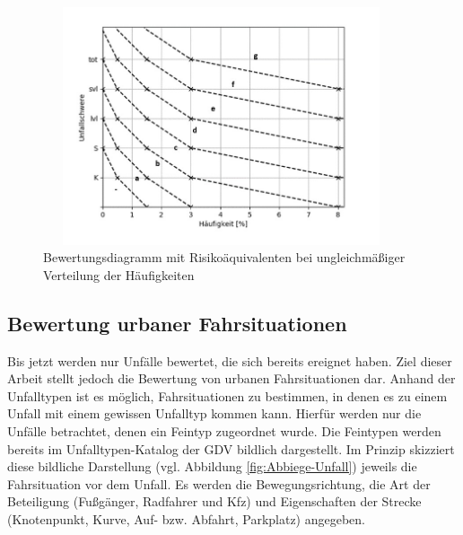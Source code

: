 \begin{savenotes}
	\begin{figure}[H]
		\centering
		\includegraphics[width=10.5cm,height=7cm]{figures/Bewertungsdiagramm(2)}
		\caption[Bewertungsdiagramm mit Risikoäquivalenten bei ungleichmäßiger Verteilung der Häufigkeiten]{Bewertungsdiagramm mit Risikoäquivalenten bei ungleichmäßiger Verteilung der Häufigkeiten}\label{fig:Bewertungsdiagramm(2)}
	\end{figure}
\end{savenotes}

\subsection{Bewertung urbaner Fahrsituationen}\label{subsection:Bewertungs urbaner Fahrsituationen}
Bis jetzt werden nur Unfälle bewertet, die sich bereits ereignet haben. Ziel dieser Arbeit stellt jedoch die Bewertung von urbanen Fahrsituationen dar. Anhand der Unfalltypen ist es möglich, Fahrsituationen zu bestimmen, in denen es zu einem Unfall mit einem gewissen Unfalltyp kommen kann. Hierfür werden nur die Unfälle betrachtet, denen ein Feintyp zugeordnet wurde. Die Feintypen werden bereits im Unfalltypen-Katalog der GDV bildlich dargestellt. Im Prinzip skizziert diese bildliche Darstellung (vgl. Abbildung \ref{fig:Abbiege-Unfall}) jeweils die Fahrsituation vor dem Unfall. Es werden die Bewegungsrichtung, die Art der Beteiligung (Fußgänger, Radfahrer und Kfz) und Eigenschaften der Strecke (Knotenpunkt, Kurve, Auf- bzw. Abfahrt, Parkplatz) angegeben.


